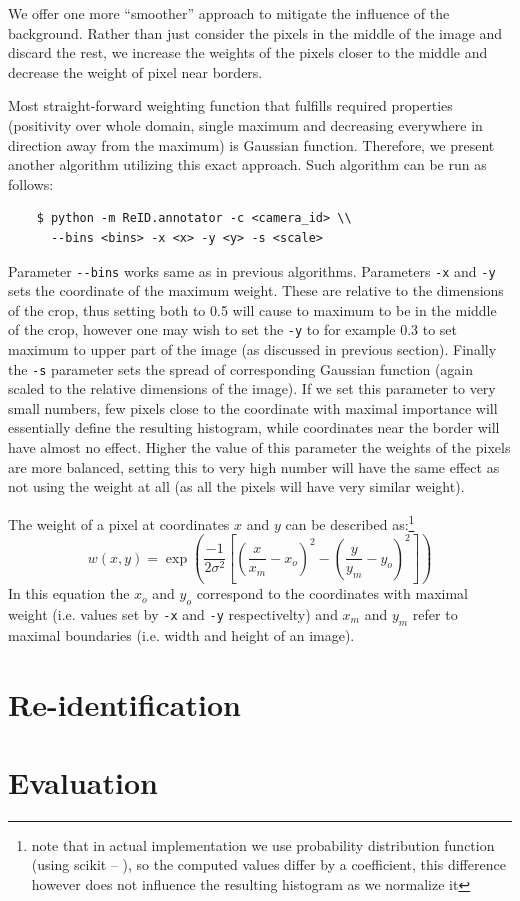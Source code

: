 We offer one more ``smoother'' approach to mitigate the influence of the background.
Rather than just consider the pixels in the middle of the image and discard the rest,
we increase the weights of the pixels closer to the middle and decrease the weight
of pixel near borders.

Most straight-forward weighting function that fulfills required properties (positivity
over whole domain, single maximum and decreasing everywhere in direction away from the
maximum) is Gaussian function. Therefore, we present another algorithm utilizing this
exact approach. Such algorithm can be run as follows:

\begin{verbatim}
    $ python -m ReID.annotator -c <camera_id> \\
      --bins <bins> -x <x> -y <y> -s <scale>
\end{verbatim}

Parameter \verb+--bins+ works same as in previous algorithms. Parameters \verb+-x+ and
\verb+-y+ sets the coordinate of the maximum weight. These are relative to the dimensions
of the crop, thus setting both to 0.5 will cause to maximum to be in the middle of the
crop, however one may wish to set the \verb+-y+ to for example 0.3 to set maximum to
upper part of the image (as discussed in previous section). Finally the \verb+-s+
parameter sets the spread of corresponding Gaussian function (again scaled to the 
relative dimensions of the image). If we set this parameter
to very small numbers, few pixels close to the coordinate with maximal importance will
essentially define the resulting histogram, while coordinates near the border will
have almost no effect. Higher the value of this parameter the weights of the pixels are
more balanced, setting this to very high number will have the same effect as not using
the weight at all (as all the pixels will have very similar weight).

The weight of a pixel at coordinates $x$ and $y$ can be described as:\footnote{note that 
in actual implementation we use probability distribution function (using scikit -- 
\cite{scipy}), so the computed values differ by a coefficient, this difference however 
does not influence the resulting histogram as we normalize it}
$$w(x,y) = \exp\left(\frac{-1}{2\sigma^2} \left[\left(\frac{x}{x_m}-x_o\right)^2 - \left(\frac{y}{y_m}-y_o\right)^2 \right]\right)$$
In this equation the $x_o$ and $y_o$ correspond to the coordinates with maximal
weight (i.e. values set by \verb+-x+ and \verb+-y+ respectivelty) and $x_m$ and $y_m$
refer to maximal boundaries (i.e. width and height of an image).
\chapter{Re-identification}
\label{ch:reidentification}


\chapter{Evaluation}
\label{ch:evaluation}

